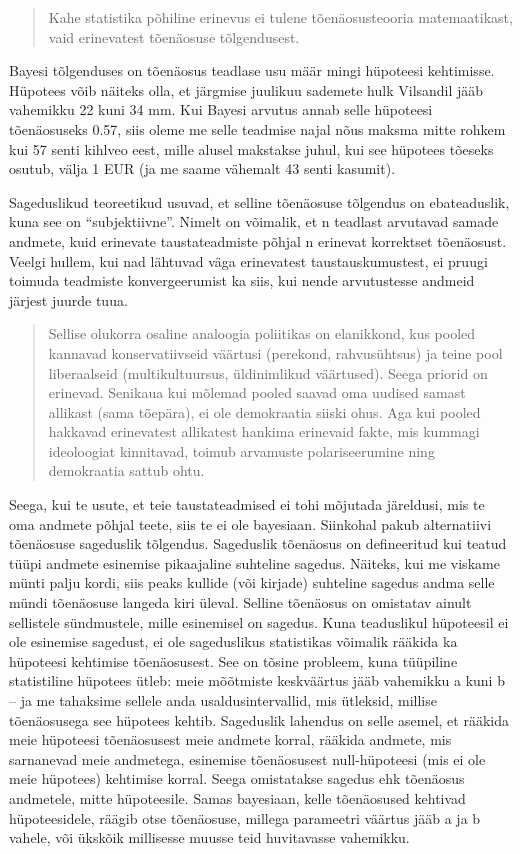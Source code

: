 \documentclass[]{book}
\begin{document}
\begin{quote}
Kahe statistika põhiline erinevus ei tulene tõenäosusteooria matemaatikast, vaid erinevatest tõenäosuse tõlgendusest.
\end{quote}

Bayesi tõlgenduses on tõenäosus teadlase usu määr mingi hüpoteesi kehtimisse.
Hüpotees võib näiteks olla, et järgmise juulikuu sademete hulk Vilsandil jääb vahemikku 22 kuni 34 mm.
Kui Bayesi arvutus annab selle hüpoteesi tõenäosuseks 0.57, siis oleme me selle teadmise najal nõus maksma mitte rohkem kui 57 senti kihlveo eest, mille alusel makstakse juhul, kui see hüpotees tõeseks osutub, välja 1 EUR (ja me saame vähemalt 43 senti kasumit).

Sageduslikud teoreetikud usuvad, et selline tõenäosuse tõlgendus on ebateaduslik, kuna see on ``subjektiivne''.
Nimelt on võimalik, et n teadlast arvutavad samade andmete, kuid erinevate taustateadmiste põhjal n erinevat korrektset tõenäosust. Veelgi hullem, kui nad lähtuvad väga erinevatest taustauskumustest, ei pruugi toimuda teadmiste konvergeerumist ka siis, kui nende arvutustesse andmeid järjest juurde tuua.

\begin{quote}
Sellise olukorra osaline analoogia poliitikas on elanikkond, kus pooled kannavad konservatiivseid väärtusi (perekond, rahvusühtsus) ja teine pool liberaalseid (multikultuursus, üldinimlikud väärtused). Seega priorid on erinevad. Senikaua kui mõlemad pooled saavad oma uudised samast allikast (sama tõepära), ei ole demokraatia siiski ohus. Aga kui pooled hakkavad erinevatest allikatest hankima erinevaid fakte, mis kummagi ideoloogiat kinnitavad, toimub arvamuste polariseerumine ning demokraatia sattub ohtu.
\end{quote}

Seega, kui te usute, et teie taustateadmised ei tohi mõjutada järeldusi, mis te oma andmete põhjal teete, siis te ei ole bayesiaan.
Siinkohal pakub alternatiivi tõenäosuse sageduslik tõlgendus.
Sageduslik tõenäosus on defineeritud kui teatud tüüpi andmete esinemise pikaajaline suhteline sagedus.
Näiteks, kui me viskame münti palju kordi, siis peaks kullide (või kirjade) suhteline sagedus andma selle mündi tõenäosuse langeda kiri üleval.
Selline tõenäosus on omistatav ainult sellistele sündmustele, mille esinemisel on sagedus.
Kuna teaduslikul hüpoteesil ei ole esinemise sagedust, ei ole sageduslikus statistikas võimalik rääkida ka hüpoteesi kehtimise tõenäosusest. See on tõsine probleem, kuna tüüpiline statistiline hüpotees ütleb: meie mõõtmiste keskväärtus jääb vahemikku a kuni b -- ja me tahaksime sellele anda usaldusintervallid, mis ütleksid, millise tõenäosusega see hüpotees kehtib.
Sageduslik lahendus on selle asemel, et rääkida meie hüpoteesi tõenäosusest meie andmete korral, rääkida andmete, mis sarnanevad meie andmetega, esinemise tõenäosusest null-hüpoteesi (mis ei ole meie hüpotees) kehtimise korral.
Seega omistatakse sagedus ehk tõenäosus andmetele, mitte hüpoteesile.
Samas bayesiaan, kelle tõenäosused kehtivad hüpoteesidele, räägib otse tõenäosuse, millega parameetri väärtus jääb a ja b vahele, või ükskõik millisesse muusse teid huvitavasse vahemikku.
\end{document}
